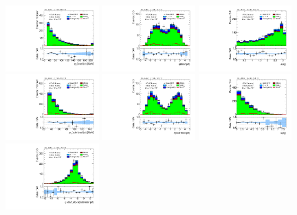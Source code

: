 \begin{figure}[tp]
  \includegraphics[width=0.32\textwidth]{figures/analysis/vbf-WlvCR/jet-1-pt}
  \includegraphics[width=0.32\textwidth]{figures/analysis/vbf-WlvCR/jet-1-eta}
  \includegraphics[width=0.32\textwidth]{figures/analysis/vbf-WlvCR/jets-dphi}
  \includegraphics[width=0.32\textwidth]{figures/analysis/vbf-WlvCR/jet-2-pt}
  \includegraphics[width=0.32\textwidth]{figures/analysis/vbf-WlvCR/jet-2-eta}
  \includegraphics[width=0.32\textwidth]{figures/analysis/vbf-WlvCR/jets-deta}
  \includegraphics[width=0.32\textwidth]{figures/analysis/vbf-WlvCR/jets-etaprod}

\end{figure}
